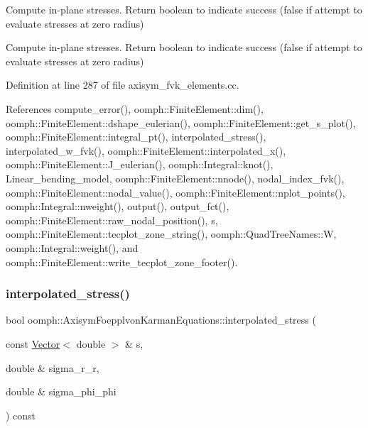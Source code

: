 Compute in-\/plane stresses. Return boolean to indicate success (false if attempt to evaluate stresses at zero radius) 

Compute in-\/plane stresses. Return boolean to indicate success (false if attempt to evaluate stresses at zero radius) 

Definition at line 287 of file axisym\+\_\+fvk\+\_\+elements.\+cc.



References compute\+\_\+error(), oomph\+::\+Finite\+Element\+::dim(), oomph\+::\+Finite\+Element\+::dshape\+\_\+eulerian(), oomph\+::\+Finite\+Element\+::get\+\_\+s\+\_\+plot(), oomph\+::\+Finite\+Element\+::integral\+\_\+pt(), interpolated\+\_\+stress(), interpolated\+\_\+w\+\_\+fvk(), oomph\+::\+Finite\+Element\+::interpolated\+\_\+x(), oomph\+::\+Finite\+Element\+::\+J\+\_\+eulerian(), oomph\+::\+Integral\+::knot(), Linear\+\_\+bending\+\_\+model, oomph\+::\+Finite\+Element\+::nnode(), nodal\+\_\+index\+\_\+fvk(), oomph\+::\+Finite\+Element\+::nodal\+\_\+value(), oomph\+::\+Finite\+Element\+::nplot\+\_\+points(), oomph\+::\+Integral\+::nweight(), output(), output\+\_\+fct(), oomph\+::\+Finite\+Element\+::raw\+\_\+nodal\+\_\+position(), s, oomph\+::\+Finite\+Element\+::tecplot\+\_\+zone\+\_\+string(), oomph\+::\+Quad\+Tree\+Names\+::W, oomph\+::\+Integral\+::weight(), and oomph\+::\+Finite\+Element\+::write\+\_\+tecplot\+\_\+zone\+\_\+footer().

\mbox{\label{classoomph_1_1AxisymFoepplvonKarmanEquations_a22d4a63c862395cae211773748c4c896}} 
\subsubsection{\texorpdfstring{interpolated\+\_\+stress()}{interpolated\_stress()}\hspace{0.1cm}{\footnotesize\ttfamily [2/2]}}
{\footnotesize\ttfamily bool oomph\+::\+Axisym\+Foepplvon\+Karman\+Equations\+::interpolated\+\_\+stress (\begin{DoxyParamCaption}\item[{const \hyperlink{classoomph_1_1Vector}{Vector}$<$ double $>$ \&}]{s,  }\item[{double \&}]{sigma\+\_\+r\+\_\+r,  }\item[{double \&}]{sigma\+\_\+phi\+\_\+phi }\end{DoxyParamCaption}) const}



